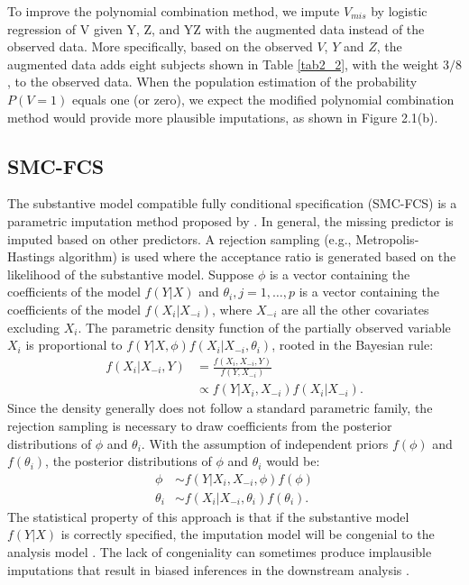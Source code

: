 	To improve the polynomial combination method, we impute $V_{mis}$ by logistic regression of V given Y, Z, and YZ with the augmented data instead of the observed data. More specifically, based on the observed $V$, $Y$ and $Z$, the augmented data adds eight subjects shown in Table \ref{tab2_2}, with the weight $3/8$, to the observed data. When the population estimation of the probability $P(V = 1)$ equals one (or zero), we expect the modified polynomial combination method would provide more plausible imputations, as shown in Figure 2.1(b).
	
	
	
	
	\subsection{SMC-FCS} 
	The substantive model compatible fully conditional specification (SMC-FCS) is a parametric imputation method proposed by \citet{bartlett2015multiple}. In general, the missing predictor is imputed based on other predictors. A rejection sampling (e.g., Metropolis-Hastings algorithm) is used where the acceptance ratio is generated based on the likelihood of the substantive model. Suppose $\phi$ is a vector containing the coefficients of the model $f(Y|X)$ and $\theta_{i}, j = 1, \dots, p$ is a vector containing the coefficients of the model $f(X_{i}|X_{-i})$, where $X_{-i}$ are all the other covariates excluding $X_{i}$. The parametric density function of the partially observed variable $X_{i}$ is proportional to $f(Y|X, \phi)f(X_{i}|X_{-i}, \theta_{i})$, rooted in the Bayesian rule:
	\begin{equation}
		\begin{array}{ll}
			f(X_{i}|X_{-i}, Y) &= \frac{f(X_{i}, X_{-i}, Y)}{f(Y, X_{-i})}\\
			&\propto f(Y|X_{i}, X_{-i})f(X_{i}|X_{-i}).
		\end{array} 
	\end{equation}
	Since the density generally does not follow a standard parametric family, the rejection sampling is necessary to draw coefficients from the posterior distributions of $\phi$ and $\theta_{i}$. With the assumption of independent priors $f(\phi)$ and $f(\theta_{i})$, the posterior distributions of $\phi$ and $\theta_{i}$ would be:
	\begin{equation}
		\begin{array}{ll}
			\phi &\sim f(Y|X_{i}, X_{-i}, \phi)f(\phi)\\
			\theta_{i} &\sim f(X_{i}|X_{-i}, \theta_{i})f(\theta_{i}).
		\end{array}
	\end{equation}
	The statistical property of this approach is that if the substantive model $f(Y|X)$ is correctly specified, the imputation model will be congenial to the analysis model \citep{meng1994multiple}. The lack of congeniality can sometimes produce implausible imputations that result in biased inferences in the downstream analysis \citep{robins2000inference}. 
